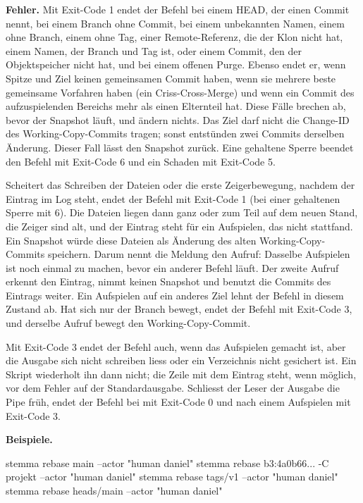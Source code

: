 {\bf Fehler.} Mit Exit-Code 1 endet der Befehl bei einem HEAD, der einen Commit nennt,
bei einem Branch ohne Commit, bei einem unbekannten Namen, einem  ohne Branch,
einem  ohne Tag, einer Remote-Referenz, die der Klon nicht hat,
einem Namen, der Branch und Tag ist,
oder einem Commit, den der Objektspeicher nicht hat, und bei einem offenen Purge.
Ebenso endet er, wenn Spitze und Ziel keinen gemeinsamen Commit haben,
wenn sie mehrere beste gemeinsame Vorfahren haben (ein Criss-Cross-Merge)
und wenn ein Commit des aufzuspielenden Bereichs mehr als einen Elternteil hat.
Diese Fälle brechen ab, bevor der Snapshot läuft, und ändern nichts.
Das Ziel darf nicht die Change-ID des Working-Copy-Commits tragen; sonst entstünden zwei Commits
derselben Änderung. Dieser Fall lässt den Snapshot zurück.
Eine gehaltene Sperre beendet den Befehl mit Exit-Code 6 und ein Schaden mit Exit-Code 5.

Scheitert das Schreiben der Dateien oder die erste Zeigerbewegung, nachdem der Eintrag im Log
steht, endet der Befehl mit Exit-Code 1 (bei einer gehaltenen Sperre mit 6).
Die Dateien liegen dann ganz oder zum Teil auf dem neuen Stand, die Zeiger sind alt,
und der Eintrag steht für ein Aufspielen, das nicht stattfand.
Ein Snapshot würde diese Dateien als Änderung des alten Working-Copy-Commits speichern.
Darum nennt die Meldung den Aufruf: Dasselbe Aufspielen ist noch einmal zu machen, bevor ein
anderer Befehl läuft. Der zweite Aufruf erkennt den Eintrag, nimmt keinen Snapshot und
benutzt die Commits des Eintrags weiter.
Ein Aufspielen auf ein anderes Ziel lehnt der Befehl in diesem Zustand ab.
Hat sich nur der Branch bewegt, endet der Befehl mit Exit-Code 3, und derselbe Aufruf bewegt
den Working-Copy-Commit.

Mit Exit-Code 3 endet der Befehl auch, wenn das Aufspielen gemacht ist,
aber die Ausgabe sich nicht schreiben liess oder ein Verzeichnis nicht gesichert ist.
Ein Skript wiederholt ihn dann nicht; die Zeile mit dem Eintrag steht, wenn möglich, vor dem
Fehler auf der Standardausgabe. Schliesst der Leser der Ausgabe die Pipe früh,
endet der Befehl bei  mit Exit-Code 0 und nach einem Aufspielen mit
Exit-Code 3.

{\bf Beispiele.}

\starttyping
stemma rebase main --actor "human daniel"
stemma rebase b3:4a0b66... -C projekt --actor "human daniel"
stemma rebase tags/v1 --actor "human daniel"
stemma rebase heads/main --actor "human daniel"
\stoptyping


